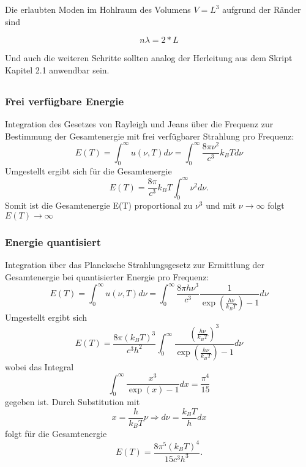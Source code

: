 \documentclass[a4paper,11pt]{article}
\begin{document}
Die erlaubten Moden im Hohlraum des Volumens $V = L^3$ aufgrund der Ränder sind

\begin{equation}
n\lambda = 2*L
\end{equation}

Und auch die weiteren Schritte sollten analog der Herleitung aus dem Skript Kapitel 2.1 anwendbar sein.

\subsection{}

\subsubsection{Frei verfügbare Energie}
Integration des Gesetzes von Rayleigh und Jeans über die Frequenz zur Bestimmung der Gesamtenergie mit frei verfügbarer Strahlung pro Frequenz:
\begin{equation}
    E(T) = \int_0^\infty u(\nu, T) d\nu = \int_0^\infty \frac{8\pi\nu^2}{c^3}k_BT d\nu
\end{equation}
Umgestellt ergibt sich für die Gesamtenergie
\begin{equation}
    E(T) = \frac{8\pi}{c^3}k_BT \int_0^\infty \nu^2 d\nu.
\end{equation}
Somit ist die Gesamtenergie E(T) proportional zu $\nu^3$ und mit $\nu \rightarrow \infty$ folgt $E(T) \rightarrow \infty$

\subsubsection{Energie quantisiert}
Integration über das Plancksche Strahlungsgesetz zur Ermittlung der Gesamtenergie bei quantisierter Energie pro Frequenz:
\begin{equation}
    E(T) = \int_0^\infty u(\nu, T) d\nu = \int_0^\infty \frac{8\pi h\nu^3}{c^3}\frac{1}{\exp(\frac{h\nu}{k_BT}) - 1} d\nu
\end{equation}
Umgestellt ergibt sich
\begin{equation}
    E(T) = \frac{8\pi (k_BT)^3}{c^3h^2} \int_0^\infty \frac{(\frac{h\nu}{k_BT})^3}{\exp(\frac{h\nu}{k_BT}) - 1} d\nu
\end{equation}
wobei das Integral 
\begin{equation}
    \int_0^\infty \frac{x^3}{\exp(x) - 1} dx = \frac{\pi^4}{15}
\end{equation}
gegeben ist.
Durch Substitution mit 
\begin{equation}
    x = \frac{h}{k_BT}\nu \Rightarrow d\nu = \frac{k_BT}{h} dx
\end{equation}
folgt für die Gesamtenergie
\begin{equation}
    E(T) = \frac{8\pi^5 (k_BT)^4}{15c^3h^3}.
\end{equation}
\end{document}
